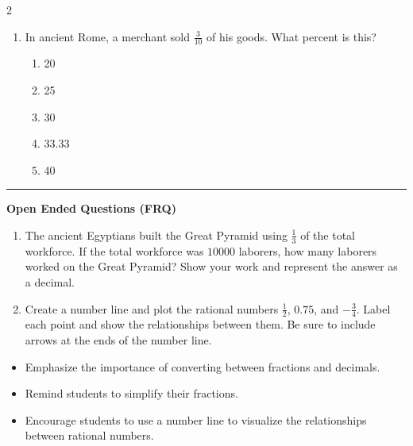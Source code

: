\documentclass[10pt]{article}
\begin{document}
\begin{multicols}{2}
\begin{enumerate}[label=\textbf{Q\arabic*.}, leftmargin=*, itemsep=6pt, parsep=0pt]
  \item \small In ancient Rome, a merchant sold $\frac{3}{10}$ of his goods. What percent is this?
  \begin{enumerate}[label=(\Alph*), leftmargin=0.6cm, nosep, itemsep=2pt]
    \item 20%
    \item 25%
    \item 30%
    \item 33.33%
    \item 40%
  \end{enumerate}

\end{enumerate}
\end{multicols}

\vspace{-0.2cm}
\hrule
\vspace{0.2cm}
\textbf{\small Open Ended Questions (FRQ)}
\begin{enumerate}[label=\textbf{Q\arabic*.}, start=9, itemsep=5pt, topsep=0pt]

  \item \small The ancient Egyptians built the Great Pyramid using $\frac{1}{3}$ of the total workforce. If the total workforce was $10000$ laborers, how many laborers worked on the Great Pyramid? Show your work and represent the answer as a decimal. \vspace{2cm}

  \item \small Create a number line and plot the rational numbers $\frac{1}{2}$, $0.75$, and $-\frac{3}{4}$. Label each point and show the relationships between them. Be sure to include arrows at the ends of the number line. \vspace{2cm}

\end{enumerate}

\vfill

\begin{tcolorbox}[colback=blue!5, colframe=mainblue!50, title=\small \textbf{Chef's Tips}, fonttitle=\bfseries, bottom=1mm]
\begin{itemize}[noitemsep, topsep=2pt, leftmargin=0.5cm]
  \item \scriptsize Emphasize the importance of converting between fractions and decimals.\item \scriptsize Remind students to simplify their fractions.\item \scriptsize Encourage students to use a number line to visualize the relationships between rational numbers.
\end{itemize}
\end{tcolorbox}
\end{document}
